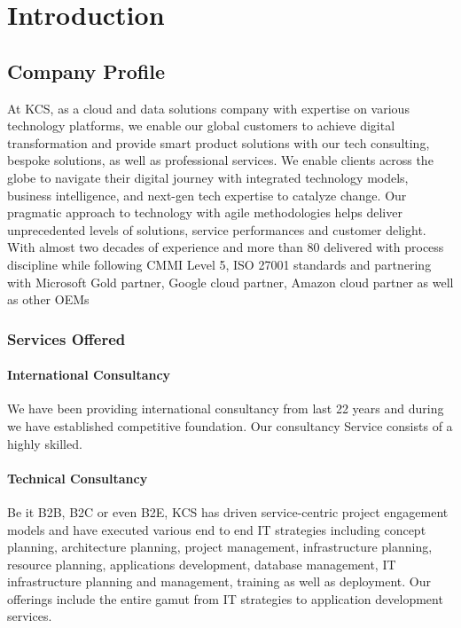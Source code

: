 \chapter{Introduction}



\section{Company Profile}

At KCS, as a cloud and data solutions company with expertise on various technology
platforms, we enable our global customers to achieve digital transformation and provide
smart product solutions with our tech consulting, bespoke solutions, as well as
professional services. We enable clients across the globe to navigate their digital journey
with integrated technology models, business intelligence, and next-gen tech expertise to
catalyze change.
Our pragmatic approach to technology with agile methodologies helps deliver
unprecedented levels of solutions, service performances and customer delight. With
almost two decades of experience and more than 80%
delivered with process discipline while following CMMI Level 5, ISO 27001 standards
and partnering with Microsoft Gold partner, Google cloud partner, Amazon cloud partner
as well as other OEMs


\subsection{ Services Offered }
\subsubsection{International Consultancy}
We have been providing international consultancy from last 22 years and during we have established competitive foundation. Our consultancy Service consists of a highly skilled.



\subsubsection{Technical Consultancy}
Be it B2B, B2C or even B2E, KCS has driven service-centric project engagement models and have executed various end to end IT strategies including concept planning, architecture planning, project management, infrastructure planning, resource planning, applications development, database management, IT infrastructure planning and management, training as well as deployment. Our offerings include the
entire gamut from IT strategies to application development services.


